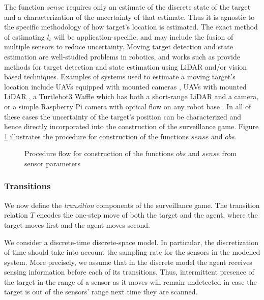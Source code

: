 The function $sense$ requires only an estimate of the discrete state of the target and a characterization of the uncertainty of that estimate. Thus it is agnostic to the specific methodology of how target's location is estimated. The exact method of estimating $l_t$ will be application-specific, and may include the fusion of multiple sensors to reduce uncertainty. Moving target detection and state estimation are well-studied problems in robotics, and works such as \cite{niazi2014,mendes2004,sun2016} provide methods for target detection and state estimation using LiDAR and/or vision based techniques. Examples of systems used to estimate a moving target's location include UAVs equipped with mounted cameras \cite{dobrokhodov2006vision,teuliere2011chasing}, UAVs with mounted LiDAR \cite{tulldahl2015accuracy}, a Turtlebot3 Waffle which has both a short-range LiDAR and a camera, or a simple Raspberry Pi camera with optical flow on any robot base \cite{kale2015}. In all of these cases the uncertainty of the target's position can be characterized and hence directly incorporated into the construction of the surveillance game. Figure \ref{fig:obsfunction} illustrates the procedure for construction of the functions $sense$ and $obs$.

\begin{figure}

    \caption{Procedure flow for construction of the functions $obs$ and $sense$ from sensor parameters}
    \label{fig:obsfunction}
\end{figure}



\bigskip

\subsubsection*{\textbf{Transitions}} We now define the \emph{transition} components of the surveillance game. 
The transition relation $T$ encodes the one-step move of both the target and the agent, where the target moves first and the agent moves second. 

We consider a discrete-time discrete-space model. In particular, the discretization of time should take into account the sampling rate for the sensors in the modelled system. More precisely, we assume that in the discrete model the agent receives sensing information before each of its transitions. Thus, intermittent presence of the target in the range of a sensor as it moves will remain undetected in case the target is out of the sensors' range next time they are scanned.

